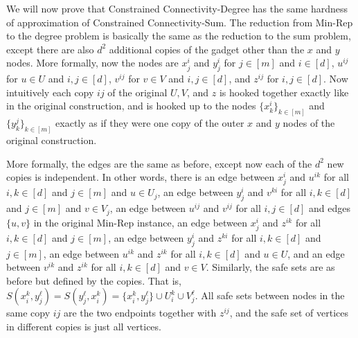 \documentclass[11pt,letterpaper]{article}
\theoremstyle{definition}
\begin{document}
We will now prove that {\sc Constrained Connectivity-Degree} has the same hardness of approximation of {\sc Constrained Connectivity-Sum}.  The reduction from {\sc Min-Rep} to the degree problem is basically the same as the reduction to the sum problem, except there are also $d^2$ additional copies of the gadget other than the $x$ and $y$ nodes.  More formally, now the nodes are $x_j^i$ and $y_j^i$ for $j \in [m]$ and $i \in [d]$, $u^{ij}$ for $u \in U$ and $i,j \in [d]$, $v^{ij}$ for $v \in V$ and $i,j \in [d]$, and $z^{ij}$ for $i,j \in [d]$.  Now intuitively each copy $ij$ of the original $U,V$, and $z$ is hooked together exactly like in the original construction, and is hooked up to the nodes $\{x_k^i\}_{k \in [m]}$ and $\{y_k^j\}_{k \in [m]}$ exactly as if they were one copy of the outer $x$ and $y$ nodes of the original construction.

More formally, the edges are the same as before, except now each of the $d^2$ new copies is independent.  In other words, there is an edge between $x_j^i$ and $u^{ik}$ for all $i,k \in [d]$ and $j \in [m]$ and $u \in U_j$, an edge between $y_j^i$ and $v^{ki}$ for all $i,k \in [d]$ and $j \in [m]$ and $v \in V_j$, an edge between $u^{ij}$ and $v^{ij}$ for all $i,j \in [d]$ and edges $\{u,v\}$ in the original {\sc Min-Rep} instance, an edge between $x_j^i$ and $z^{ik}$ for all $i,k \in [d]$ and $j \in [m]$, an edge between $y_j^i$ and $z^{ki}$ for all $i,k \in [d]$ and $j \in [m]$, an edge between $u^{ik}$ and $z^{ik}$ for all $i,k \in [d]$ and $u \in U$, and an edge between $v^{ik}$ and $z^{ik}$ for all $i,k \in [d]$ and $v \in V$.  Similarly, the safe sets are as before but defined by the copies.  That is, $S(x_i^k, y_j^{\ell}) = S(y_j^{\ell}, x_i^k) = \{x_i^k, y_j^{\ell}\} \cup U_i^k \cup V_j^{\ell}$.  All safe sets between nodes in the same copy $ij$ are the two endpoints together with $z^{ij}$, and the safe set of vertices in different copies is just all vertices.
\end{document}
